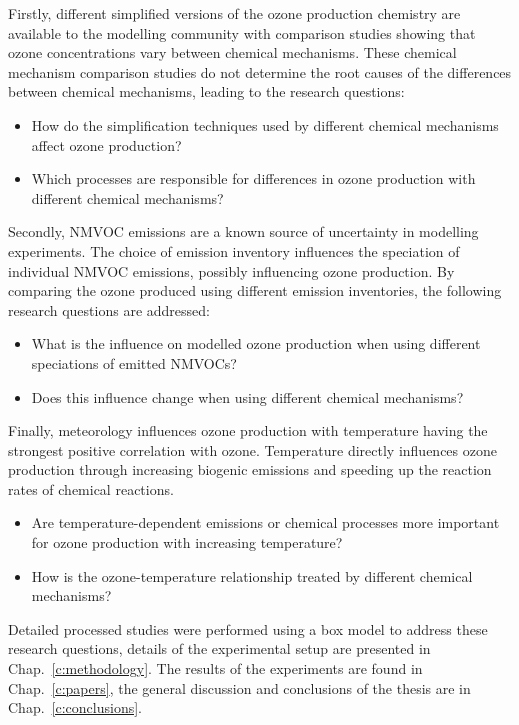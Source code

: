 Firstly, different simplified versions of the ozone production chemistry are available to the modelling community with comparison studies showing that ozone concentrations vary between chemical mechanisms.
These chemical mechanism comparison studies do not determine the root causes of the differences between chemical mechanisms, leading to the research questions:
\begin{itemize}
	\item How do the simplification techniques used by different chemical mechanisms affect ozone production? 
    \item Which processes are responsible for differences in ozone production with different chemical mechanisms?
\end{itemize}

\newpage
Secondly, NMVOC emissions are a known source of uncertainty in modelling experiments.
The choice of emission inventory influences the speciation of individual NMVOC emissions, possibly influencing ozone production.
By comparing the ozone produced using different emission inventories, the following research questions are addressed:
\begin{itemize}
	\item What is the influence on modelled ozone production when using different speciations of emitted NMVOCs? 
    \item Does this influence change when using different chemical mechanisms?
\end{itemize}

Finally, meteorology influences ozone production with temperature having the strongest positive correlation with ozone.
Temperature directly influences ozone production through increasing biogenic emissions and speeding up the reaction rates of chemical reactions.
\begin{itemize}
    \item Are temperature-dependent emissions or chemical processes more important for ozone production with increasing temperature? 
    \item How is the ozone-temperature relationship treated by different chemical mechanisms?
\end{itemize}

Detailed processed studies were performed using a box model to address these research questions, details of the experimental setup are presented in Chap.~\ref{c:methodology}.
The results of the experiments are found in Chap.~\ref{c:papers}, the general discussion and conclusions of the thesis are in Chap.~\ref{c:conclusions}.
